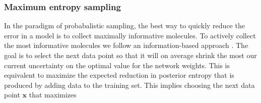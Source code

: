 \subsubsection{Maximum entropy sampling}

In the paradigm of probabalistic sampling, the best way to quickly reduce the error in a model is to collect maximally informative molecules. To actively collect the most informative molecules we follow an information-based approach \cite{MacKay_1992}. The goal
is to select the next data point so that it will on average shrink the most our current uncertainty on the optimal value for the network weights. This is equivalent to maximize the expected reduction in posterior entropy that is produced by adding data to the training set. This implies choosing the next data point $\mathbf{x}$ that maximizes
